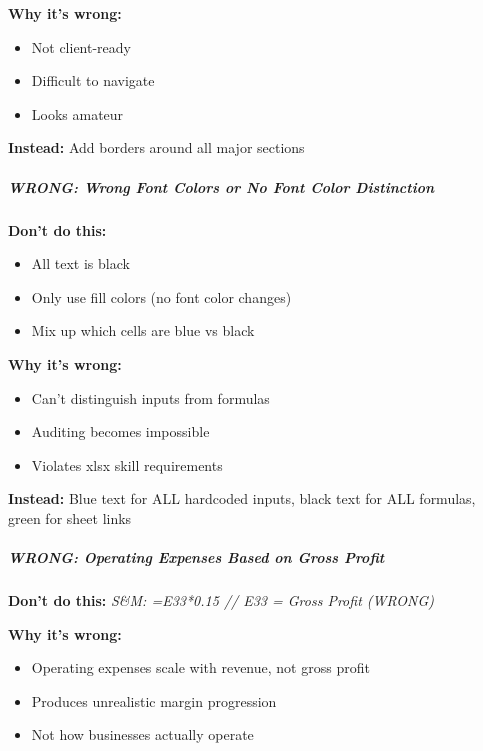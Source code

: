 \documentclass[11pt]{article}
\begin{document}
\textbf{Why it's wrong:}

\begin{itemize}[leftmargin=*,itemsep=2pt,topsep=2pt]
\item {} Not client-ready
\item {} Difficult to navigate
\item {} Looks amateur
\end{itemize}

\textbf{Instead:} Add borders around all major sections


\subparagraph{WRONG: Wrong Font Colors or No Font Color Distinction}\mbox{}\par

\textbf{Don't do this:}

\begin{itemize}[leftmargin=*,itemsep=2pt,topsep=2pt]
\item {} All text is black
\item {} Only use fill colors (no font color changes)
\item {} Mix up which cells are blue vs black
\end{itemize}

\textbf{Why it's wrong:}

\begin{itemize}[leftmargin=*,itemsep=2pt,topsep=2pt]
\item {} Can't distinguish inputs from formulas
\item {} Auditing becomes impossible
\item {} Violates xlsx skill requirements
\end{itemize}

\textbf{Instead:} Blue text for ALL hardcoded inputs, black text for ALL formulas, green for sheet links


\subparagraph{WRONG: Operating Expenses Based on Gross Profit}\mbox{}\par

\textbf{Don't do this:} \emph{S\&M: =E33*0.15    // E33 = Gross Profit (WRONG)}


\textbf{Why it's wrong:}

\begin{itemize}[leftmargin=*,itemsep=2pt,topsep=2pt]
\item {} Operating expenses scale with revenue, not gross profit
\item {} Produces unrealistic margin progression
\item {} Not how businesses actually operate
\end{itemize}
\end{document}
